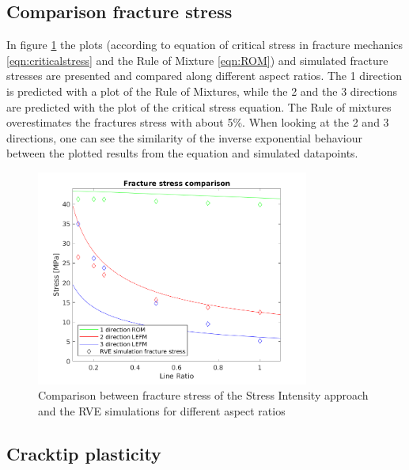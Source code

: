 \subsection{Comparison fracture stress}
In figure \ref{fig:fracturestress} the plots (according to equation of critical stress in fracture mechanics \ref{eqn:criticalstress} and the Rule of Mixture \ref{eqn:ROM}) and simulated fracture stresses are presented and compared along different aspect ratios. The 1 direction is predicted with a plot of the Rule of Mixtures, while the 2 and the 3 directions are predicted with the plot of the critical stress equation. The Rule of mixtures overestimates the fractures stress with about 5\%. 
When looking at the 2 and 3 directions, one can see the similarity of the inverse exponential behaviour between the plotted results from the equation and simulated datapoints. 


\begin{figure}[H]
    \centering
    \includegraphics[width=0.80\textwidth]{chapter_7_non-elasticmodelling/figures/yieldstress.png}
    \caption{Comparison between fracture stress of the Stress Intensity approach and the RVE simulations for different aspect ratios}
    \label{fig:fracturestress}
\end{figure}
\subsection{Cracktip plasticity}

